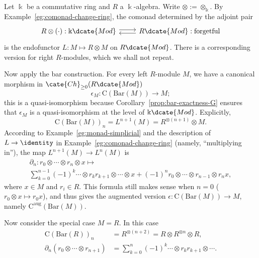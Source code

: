 \begin{example}\label{eg:HH-comonad}
	Let $\Bbbk$ be a commutative ring and $R$ a $\Bbbk$-algebra. Write
	$\otimes:=\otimes_{\Bbbk}$. By Example~\ref{eg:comonad-change-ring}, the
	comonad determined by the adjoint pair
	\[\begin{tikzcd}
		R \otimes (\cdot): \Bbbk\dcate{Mod} \arrow[shift left, r] & R\dcate{Mod}: \text{forgetful} \arrow[shift left, l]
	\end{tikzcd}\]
	is the endofunctor $L:M\mapsto R\otimes M$ on $R\dcate{Mod}$. There is a
	corresponding version for right $R$-modules, which we shall not repeat.

	Now apply the bar construction. For every left $R$-module $M$, we have a
	canonical morphism in $\cate{Ch}_{\geq0}(R\dcate{Mod})$
	\[ \epsilon_M: \mathrm{C}(\mathrm{Bar}(M)) \to M; \]
	this is a quasi-isomorphism because
	Corollary~\ref{prop:bar-exactness-G} ensures that $\epsilon_M$ is a
	quasi-isomorphism at the level of $\Bbbk\dcate{Mod}$. Explicitly,
	\[ \mathrm{C}(\mathrm{Bar}(M))_n = L^{n+1}(M) = R^{\otimes (n+1)} \otimes M. \]
	According to Example~\ref{eg:monad-simplicial} and the description of
	$L\to\identity$ in Example~\ref{eg:comonad-change-ring} (namely,
	``multiplying in''), the map $L^{n+1}(M)\to L^n(M)$ is
	\begin{multline*}
		\partial_n: r_0 \otimes \cdots \otimes r_n \otimes x \mapsto \\
		\sum_{k=0}^{n-1} (-1)^k \cdots \otimes r_k r_{k+1} \otimes \cdots \otimes x + (-1)^n r_0 \otimes \cdots \otimes r_{n-1} \otimes r_n x,
	\end{multline*}
	where $x\in M$ and $r_i\in R$. This formula still makes sense when
	$n=0$ ($r_0\otimes x\mapsto r_0x$), and thus gives the augmented version
	$\epsilon:\mathrm{C}(\mathrm{Bar}(M))\to M$, namely
	$\mathrm{C}^{\mathrm{aug}}(\mathrm{Bar}(M))$.

	Now consider the special case $M=R$. In this case
	\begin{align*}
		\mathrm{C}(\mathrm{Bar}(R))_n & = R^{\otimes (n+2)} = R \otimes R^{\otimes n} \otimes R, \\
		\partial_n(r_0 \otimes \cdots \otimes r_{n+1}) & = \sum_{k=0}^n (-1)^k \cdots \otimes r_k r_{k+1} \otimes \cdots.
	\end{align*}


\end{example}
